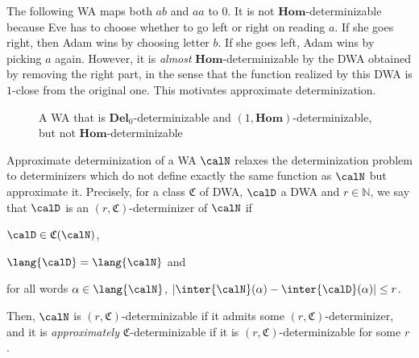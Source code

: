 \begin{example}\label{ex:regret}
The following WA maps both $ab$ and $aa$ to $0$. It is not 
$\mathbf{Hom}$-determinizable because Eve has to choose whether to go
left or right on reading $a$. If she goes right, then Adam wins by
choosing letter $b$. If she goes left, Adam wins by picking $a$
again. However, it is \emph{almost} $\mathbf{Hom}$-determinizable by the DWA
obtained by removing the right part, in the sense that the function
realized by this DWA is $1$-close from the original one. This
motivates approximate determinization. 
\begin{figure}[h]
\begin{center}
\end{center}
\caption{A WA that is $\mathbf{Del}_0$-determinizable and 
$(1,\mathbf{Hom})$-determinizable, but not $\mathbf{Hom}$-determinizable}
\label{fig:example3}
\end{figure}


\end{example}

 Approximate
determinization of a WA $\calN$ relaxes the determinization problem
to determinizers which do not define
exactly the same function as $\calN$ but approximate it. Precisely, for a class
$\mathfrak{C}$ of DWA, $\calD$ a DWA and $r\in\mathbb{N}$,
we say that $\calD$ is an
$(r,\mathfrak{C})$-determinizer of $\calN$ if
\begin{inparaenum}[$(i)$]
\item $\calD\in \mathfrak{C}(\calN)$,
\item $\lang{\calD} = \lang{\calN}$ and
\item for all words $\alpha \in \lang{\calN}$, $|\inter{\calN}(\alpha)-\inter{\calD}(\alpha)|\leq r$.
\end{inparaenum}
Then, $\calN$ is $(r,\mathfrak{C})$-determinizable if
it admits some $(r,\mathfrak{C})$-determinizer, and it is 
\emph{approximately} $\mathfrak{C}$-determinizable if it is 
$(r,\mathfrak{C})$-determinizable for some $r$. 


